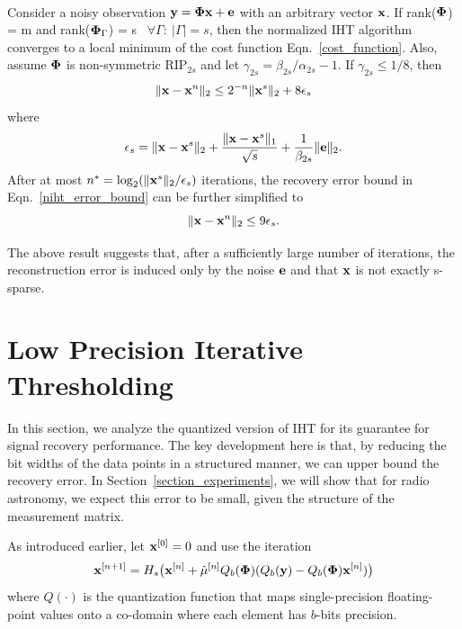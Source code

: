 \documentclass[aoas,preprint]{imsart}
\numberwithin{equation}{section}
\theoremstyle{plain}
\begin{document}
\begin{theorem}\label{guarantee_niht}
{\rm{\cite{blumensath2010niht}}}\\
Consider a noisy observation ${\bf y} = {\bf \Phi x} + {\bf e}$ with an arbitrary vector ${\bf x}$. If rank({${\bf \Phi}$}) = m and rank(${\bf \Phi}_{\Gamma}$) = s \ $\forall \Gamma:\ |\Gamma| = s$, then the normalized IHT algorithm converges to a local minimum of the cost function Eqn.~\ref{cost_function}. Also, assume ${\bf \Phi}$ is non-symmetric RIP$_{2s}$ and let $\gamma_{2s} = \beta_{2s}/\alpha_{2s}-1$. If $\gamma_{2s} \leq {1}/{8}$, then
\begin{equation}
    \| {\bf x}-{\bf x}^n\|_2 \leq 2^{-n}\| {\bf x}^s\|_2 + 8 {{\bf \epsilon}_s}\label{niht_error_bound}
\end{equation} where \begin{equation}
     {{\bf \epsilon}_s} =  \| {\bf x}-{\bf x}^s\|_2 + \frac{\| {\bf x}-{\bf x}^s\|_1}{\sqrt{s}}+\frac{1}{\beta_{2s}}\|{\bf e} \|_2.
\end{equation}
After at most $n^*=\log_2(\|{\bf x}^s\|_2/ {\bf \epsilon}_s)$ iterations, the recovery error bound in Eqn.~\ref{niht_error_bound} can be further simplified to
\begin{equation}
   \| {\bf x}-{\bf x}^n\|_2 \leq 9 {{\bf \epsilon}_s}.
\end{equation}
\end{theorem}
The above result suggests that, after a sufficiently large number of iterations, the reconstruction error is induced only by the noise ${\bf e}$ and that ${\bf x}$ is not exactly s-sparse.

\section{Low Precision Iterative Thresholding}\label{section_lpiht}

In this section, we analyze the
quantized version of IHT for 
its guarantee for signal recovery performance.
The key development here is that, by reducing the bit widths of the data points in a structured manner, we
can upper bound the recovery error. 
In Section~\ref{section_experiments},
we will show that for radio astronomy,
we expect this error to be small, given
the structure of the measurement matrix.

As introduced earlier, let ${\bf x}^{[0]} = 0$ and use the iteration
\begin{equation} \label{modified_update_rule}
  {\bf x}^{[n+1]} = H_s\big({\bf x}^{[n]}+\hat{\mu}^{[n]} Q_b(\boldsymbol{\Phi})(Q_b({\bf y})-Q_b(\boldsymbol{\Phi}){\bf x}^{[n]})\big)  
\end{equation}
where $Q(\cdot)$ is the quantization function that maps single-precision floating-point values onto a co-domain where each element has $b$-bits precision.
\end{document}
